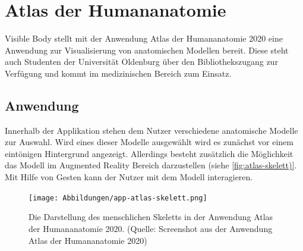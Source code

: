 \section{Atlas der Humananatomie}\label{sec:atlas-humananatomie}
Visible Body stellt mit der Anwendung \glqq Atlas der Humananatomie 2020\grqq{} eine Anwendung zur Visualisierung von anatomischen Modellen bereit.  Diese steht auch Studenten der Universität Oldenburg über den Bibliothekszugang zur Verfügung und kommt im medizinischen Bereich zum Einsatz. \\
\subsection{Anwendung}
Innerhalb der Applikation stehen dem Nutzer verschiedene anatomische Modelle zur Auswahl. Wird eines dieser Modelle ausgewählt wird es zunächst vor einem eintönigen Hintergrund angezeigt. Allerdings besteht zusätzlich die Möglichkeit das Modell im Augmented Reality Bereich darzustellen (siehe \ref{fig:atlas-skelett)}. \\
Mit Hilfe von Gesten kann der Nutzer mit dem Modell interagieren.
\begin{figure}[h!]
\centering
\texttt{[image: Abbildungen/app-atlas-skelett.png]}
\caption[Atlas der Humananatomie]{Die Darstellung des menschlichen Skeletts in der Anwendung \glqq Atlas der Humananatomie 2020\grqq . (Quelle: Screenshot aus der Anwendung \glqq Atlas der Humananatomie 2020\grqq )}
\label{fig:atlas-skelett}
\end{figure}



